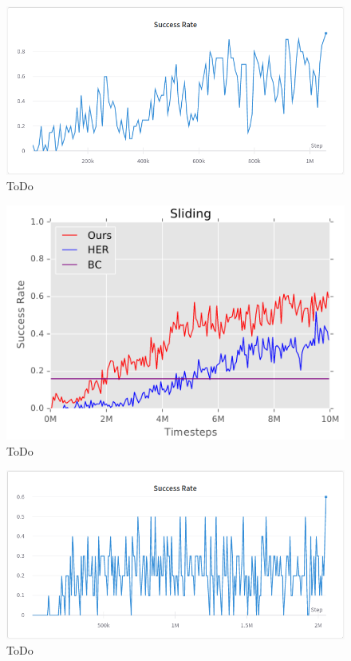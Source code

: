 \begin{figure}[h!]
    \centering
    \includegraphics[width=\textwidth]{images/FPSR.png}
    \caption{ToDo}
    \label{fig:HER}
\end{figure}

\begin{figure}[h!]
    \centering
    \includegraphics[width=\textwidth]{images/FSB.png}
    \caption{ToDo}
    \label{fig:HER}
\end{figure}

\begin{figure}[h!]
    \centering
    \includegraphics[width=\textwidth]{images/FSSR.png}
    \caption{ToDo}
    \label{fig:HER}
\end{figure}

